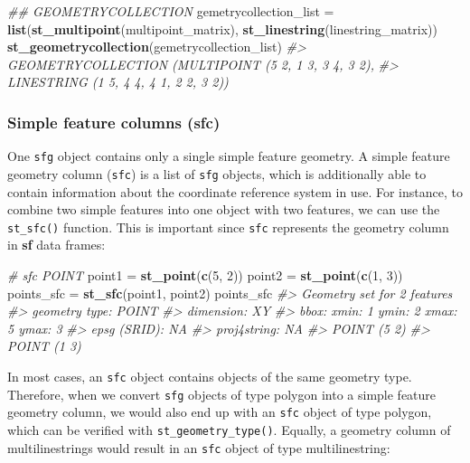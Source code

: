 \documentclass[]{krantz}
\newenvironment{Shaded}{\begin{snugshade}}{\end{snugshade}}
\newcommand{\CommentTok}[1]{\textcolor[rgb]{0.37,0.37,0.37}{\textit{#1}}}
\newcommand{\DecValTok}[1]{\textcolor[rgb]{0.06,0.06,0.06}{#1}}
\newcommand{\KeywordTok}[1]{\textcolor[rgb]{0.27,0.27,0.27}{\textbf{#1}}}
\newcommand{\NormalTok}[1]{#1}
\newcommand{\StringTok}[1]{\textcolor[rgb]{0.5,0.5,0.5}{#1}}
\begin{document}
\begin{Shaded}
\begin{Highlighting}[]
\CommentTok{## GEOMETRYCOLLECTION}
\NormalTok{gemetrycollection_list =}\StringTok{ }\KeywordTok{list}\NormalTok{(}\KeywordTok{st_multipoint}\NormalTok{(multipoint_matrix),}
                              \KeywordTok{st_linestring}\NormalTok{(linestring_matrix))}
\KeywordTok{st_geometrycollection}\NormalTok{(gemetrycollection_list)}
\CommentTok{#> GEOMETRYCOLLECTION (MULTIPOINT (5 2, 1 3, 3 4, 3 2),}
\CommentTok{#>   LINESTRING (1 5, 4 4, 4 1, 2 2, 3 2))}
\end{Highlighting}
\end{Shaded}

\hypertarget{sfc}{%
\subsubsection{Simple feature columns (sfc)}\label{sfc}}

One \texttt{sfg} object contains only a single simple feature geometry.
A simple feature geometry column (\texttt{sfc}) is a list of \texttt{sfg} objects, which is additionally able to contain information about the coordinate reference system in use.
For instance, to combine two simple features into one object with two features, we can use the \texttt{st\_sfc()} function.
This is important since \texttt{sfc} represents the geometry column in \textbf{sf} data frames:

\begin{Shaded}
\begin{Highlighting}[]
\CommentTok{# sfc POINT}
\NormalTok{point1 =}\StringTok{ }\KeywordTok{st_point}\NormalTok{(}\KeywordTok{c}\NormalTok{(}\DecValTok{5}\NormalTok{, }\DecValTok{2}\NormalTok{))}
\NormalTok{point2 =}\StringTok{ }\KeywordTok{st_point}\NormalTok{(}\KeywordTok{c}\NormalTok{(}\DecValTok{1}\NormalTok{, }\DecValTok{3}\NormalTok{))}
\NormalTok{points_sfc =}\StringTok{ }\KeywordTok{st_sfc}\NormalTok{(point1, point2)}
\NormalTok{points_sfc}
\CommentTok{#> Geometry set for 2 features }
\CommentTok{#> geometry type:  POINT}
\CommentTok{#> dimension:      XY}
\CommentTok{#> bbox:           xmin: 1 ymin: 2 xmax: 5 ymax: 3}
\CommentTok{#> epsg (SRID):    NA}
\CommentTok{#> proj4string:    NA}
\CommentTok{#> POINT (5 2)}
\CommentTok{#> POINT (1 3)}
\end{Highlighting}
\end{Shaded}

In most cases, an \texttt{sfc} object contains objects of the same geometry type.
Therefore, when we convert \texttt{sfg} objects of type polygon into a simple feature geometry column, we would also end up with an \texttt{sfc} object of type polygon, which can be verified with \texttt{st\_geometry\_type()}.
Equally, a geometry column of multilinestrings would result in an \texttt{sfc} object of type multilinestring:
\end{document}
